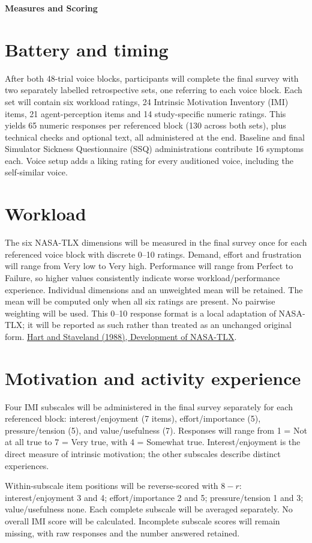 \documentclass[11pt,letterpaper]{article}
\begin{document}
{\LARGE\bfseries Measures and Scoring}\par
\section{Battery and timing}
After both 48-trial voice blocks, participants will complete the final survey with two separately labelled retrospective sets, one referring to each voice block. Each set will contain six workload ratings, 24 Intrinsic Motivation Inventory (IMI) items, 21 agent-perception items and 14 study-specific numeric ratings. This yields 65 numeric responses per referenced block (130 across both sets), plus technical checks and optional text, all administered at the end. Baseline and final Simulator Sickness Questionnaire (SSQ) administrations contribute 16 symptoms each. Voice setup adds a liking rating for every auditioned voice, including the self-similar voice.

\section{Workload}
The six NASA-TLX dimensions will be measured in the final survey once for each referenced voice block with discrete 0--10 ratings. Demand, effort and frustration will range from Very low to Very high. Performance will range from Perfect to Failure, so higher values consistently indicate worse workload/performance experience. Individual dimensions and an unweighted mean will be retained. The mean will be computed only when all six ratings are present. No pairwise weighting will be used. This 0--10 response format is a local adaptation of NASA-TLX; it will be reported as such rather than treated as an unchanged original form.
\href{https://doi.org/10.1016/S0166-4115(08)62386-9}{Hart and Staveland (1988), Development of NASA-TLX}.

\section{Motivation and activity experience}
Four IMI subscales will be administered in the final survey separately for each referenced block: interest/enjoyment (7 items), effort/importance (5), pressure/tension (5), and value/usefulness (7). Responses will range from 1 = Not at all true to 7 = Very true, with 4 = Somewhat true. Interest/enjoyment is the direct measure of intrinsic motivation; the other subscales describe distinct experiences.

Within-subscale item positions will be reverse-scored with $8-r$: interest/enjoyment 3 and 4; effort/importance 2 and 5; pressure/tension 1 and 3; value/usefulness none. Each complete subscale will be averaged separately. No overall IMI score will be calculated. Incomplete subscale scores will remain missing, with raw responses and the number answered retained.
\end{document}
